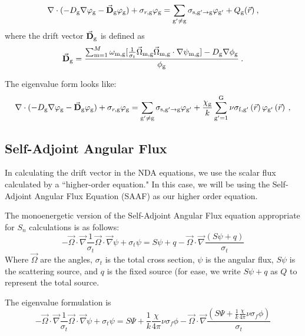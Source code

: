 \begin{equation}
  \nabla\cdot(-D_{\mathrm{g}} \nabla \varphi_{\mathrm{g}} - \vec{\bf D}_{\mathrm{g}} \varphi_{\mathrm{g}}) + \sigma_{r,\mathrm{g}} \varphi_{\mathrm{g}} = \sum\limits_{{\mathrm{g}'}\neq\mathrm{g}}\sigma_{\mathrm{s},\mathrm{g}' \rightarrow \mathrm{g}}\varphi_{\mathrm{g}'} + Q_{\mathrm{g}}(\vec{r}) \:, \label{eq:NDA_fixed_source}
  \end{equation}
  where the drift vector $\vec{\bf D}_{\mathrm{g}}$ is defined as
  \begin{equation}
  \vec{\bf D}_{\mathrm{g}}= \frac{\sum_{\mathrm{m}=1}^M \omega_{\mathrm{m}, \mathrm{g}} [\frac{1}{\sigma_t} \vec{\Omega}_{\mathrm{m}, \mathrm{g}} \vec{\Omega}_{\mathrm{m}, \mathrm{g}} \cdot \nabla\psi_{\mathrm{m}, \mathrm{g}}] - D_{\mathrm{g}} \nabla \phi_{\mathrm{g}}}{\phi_{\mathrm{g}}}\:. \label{eq:drift_vector}
  \end{equation}
 
 The eigenvalue form looks like:
 \begin{equation}
  \nabla\cdot(-D_{\mathrm{g}} \nabla \varphi_{\mathrm{g}} - \vec{\bf D}_{\mathrm{g}} \varphi_{\mathrm{g}}) + \sigma_{r,\mathrm{g}} \varphi_{\mathrm{g}} = \sum\limits_{{\mathrm{g}'}\neq\mathrm{g}}\sigma_{\mathrm{s},\mathrm{g}' \rightarrow \mathrm{g}}\varphi_{\mathrm{g}'} +  \frac{\chi_{\mathrm{g}}}{k} \sum\limits_{\mathrm{g}'=1}^{\mathrm{G}} \nu \sigma_{\mathrm{f},\mathrm{g}'}\left(\vec{r}\right) \varphi_{\mathrm{g}'}\left(\vec{r}\right) \:, \label{eq:NDA_eigenvalue}
  \end{equation}

\subsection{Self-Adjoint Angular Flux}
In calculating the drift vector in the NDA equations, we use the scalar flux calculated by a ``higher-order equation." In this case, we will be using the Self-Adjoint Angular Flux Equation (SAAF) \cite{saaf} as our higher order equation. 

The monoenergetic version of the Self-Adjoint Angular Flux equation appropriate for $S_n$ calculations is as follows:
\begin{equation}
    - \vec{\Omega} \cdot \vec{\nabla}\frac{1}{\sigma_t}\vec{\Omega} \cdot \vec{\nabla} \psi + \sigma_t \psi = S\psi + q - \vec{\Omega} \cdot \vec{\nabla} \frac{(S\psi + q)}{\sigma_t}
    \label{eq:SAAF}
\end{equation}
Where $\vec{\Omega}$ are the angles, $\sigma_t$ is the total cross section, $\psi$ is the angular flux, $S\psi$ is the scattering source, and $q$ is the fixed source (for ease, we write $S\psi + q$ as $Q$ to represent the total source.

The eigenvalue formulation is
\begin{equation}
        - \vec{\Omega} \cdot \vec{\nabla}\frac{1}{\sigma_t}\vec{\Omega} \cdot \vec{\nabla} \psi + \sigma_t \psi = S\Psi + \frac{1}{k}\frac{\chi}{4\pi}\nu\sigma_f\phi - \vec{\Omega} \cdot \vec{\nabla} \frac{(S\Psi + \frac{1}{k}\frac{\chi}{4\pi}\nu\sigma_f\phi)}{\sigma_t}
    \label{eq:SAAF-eigenvalue}
\end{equation}